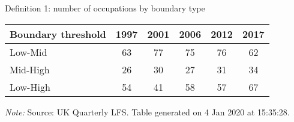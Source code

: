 \begin{center}
\begin{threeparttable}[!h]
\caption{Definition 1: number of occupations by boundary type}
\label{tab:shareBound}
\begin{tabular}{lccccc}
\toprule
\toprule
\textbf{Boundary threshold}&\multicolumn{1}{c}{\textbf{1997}}&\multicolumn{1}{c}{\textbf{2001}}&\multicolumn{1}{c}{\textbf{2006}}&\multicolumn{1}{c}{\textbf{2012}}&\multicolumn{1}{c}{\textbf{2017}} \\
\midrule
Low-Mid     &          63&          77&          75&          76&          62\\
Mid-High    &          26&          30&          27&          31&          34\\
Low-High    &          54&          41&          58&          57&          67\\
\bottomrule
\bottomrule
\end{tabular}
\begin{tablenotes}
\item\footnotesize\textit{Note:} Source: UK Quarterly LFS. Table generated on  4 Jan 2020 at 15:35:28.
\end{tablenotes}
\end{threeparttable}
\end{center}
